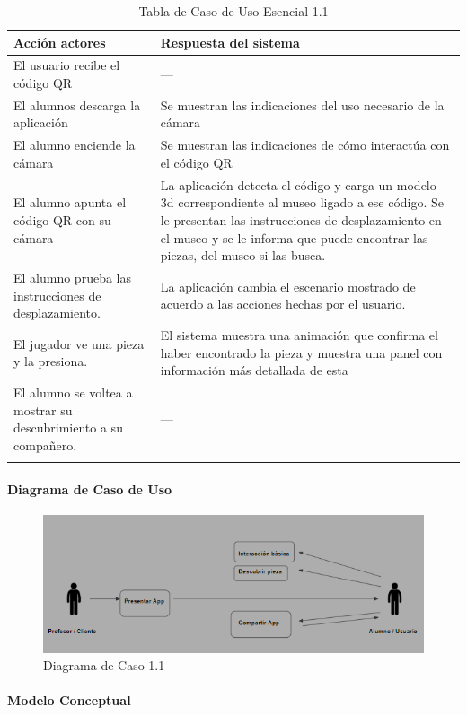 \begin{longtable}{|p{5cm}|p{8cm}|}
\hline 
Acción actores & Respuesta del sistema \\ 
\hline 
El usuario recibe el código QR & --- \\ 
\hline
El alumnos descarga la aplicación & Se muestran las indicaciones del uso necesario de la cámara \\ 
\hline 
El alumno enciende la cámara  & Se muestran las indicaciones de cómo interactúa con el código QR \\ 
\hline
El alumno apunta el código QR con su cámara & La aplicación detecta el código y carga un modelo 3d correspondiente al museo ligado a ese código.
Se le presentan las instrucciones de desplazamiento en el museo y se le informa que puede encontrar las piezas, del museo si las busca.
 \\ 
\hline
El alumno prueba las instrucciones de desplazamiento. & La aplicación cambia el escenario mostrado de acuerdo a las acciones hechas por el usuario. \\ 
\hline
El jugador ve una pieza y la presiona. & El sistema muestra una animación que confirma el haber encontrado la pieza y muestra una panel con información más detallada de esta \\ 
\hline
El alumno se voltea a mostrar su descubrimiento a su compañero. & --- \\ 
\hline
\caption{Tabla de Caso de Uso Esencial 1.1}
\label{tab21}
\end{longtable}

\paragraph{Diagrama de Caso de Uso}

\begin{figure}[H]
\centerline{\includegraphics[width=15cm]{imgs/CasoUso_1.PNG}}
\caption{Diagrama de Caso 1.1}
\label{fig_1}
\end{figure}

\paragraph{Modelo Conceptual}

